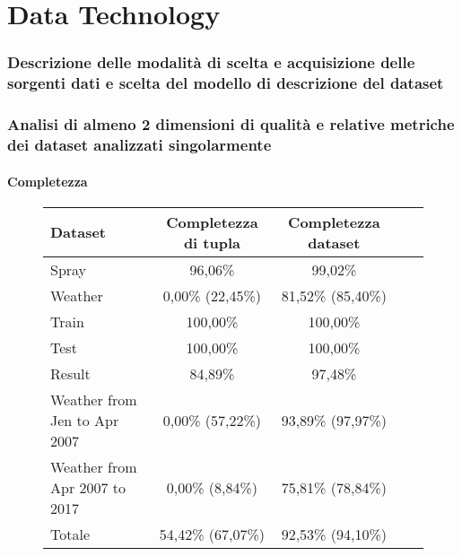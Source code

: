 \part{Data Technology}
\section{Descrizione delle modalità di scelta e acquisizione delle sorgenti dati e scelta del modello di descrizione del dataset}

\section{Analisi di almeno 2 dimensioni di qualità e relative metriche dei dataset analizzati singolarmente}
\subsection{Completezza}

\begin{figure}[H]
	\centering
	\begin{tabular}{lcccc}
		\toprule
		\textbf{Dataset} \quad & \textbf{Completezza di tupla} & \textbf{Completezza dataset} \\
				\midrule
		Spray &			96,06\%  	& 99,02\%  \\ 
		Weather &		0,00\% (22,45\%)		& 81,52\% (85,40\%) \\ 
		Train &			100,00\% 	& 100,00\%   \\ 
		Test &			100,00\% 	& 100,00\%   \\ 
		Result &		84,89\%  	& 97,48\%  \\ 
		Weather from Jen to Apr 2007 &	0,00\% (57,22\%)&	93,89\% (97,97\%) \\ 
		Weather from Apr 2007 to 2017 &		0,00\% (8,84\%)&	75,81\% (78,84\%)\\ 
		\midrule
		Totale &	    54,42\% (67,07\%) 	& 92,53\% (94,10\%) \\
		\bottomrule
	\end{tabular}
	\label{tab:completezza totale}
\end{figure}

